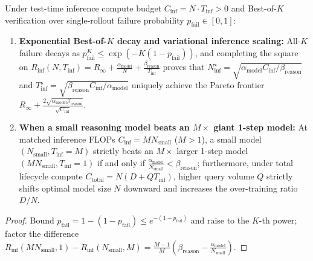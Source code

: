 \begin{lemma}\label{lem:test_time_scaling}
\leanok
{}
Under test-time inference compute budget $C_{\mathrm{inf}} = N \cdot T_{\mathrm{inf}} > 0$ and Best-of-$K$ verification over single-rollout failure probability $p_{\mathrm{fail}} \in [0,1]$:
\begin{enumerate}
\item \textbf{Exponential Best-of-$K$ decay and variational inference scaling:} All-$K$ failure decays as $p_{\mathrm{fail}}^K \le \exp(-K(1 - p_{\mathrm{fail}}))$, and completing the square on $R_{\mathrm{inf}}(N, T_{\mathrm{inf}}) = R_\infty + \frac{\alpha_{\mathrm{model}}}{N} + \frac{\beta_{\mathrm{reason}}}{T_{\mathrm{inf}}}$ proves that $N^\star_{\mathrm{inf}} = \sqrt{\alpha_{\mathrm{model}}C_{\mathrm{inf}}/\beta_{\mathrm{reason}}}$ and $T^\star_{\mathrm{inf}} = \sqrt{\beta_{\mathrm{reason}}C_{\mathrm{inf}}/\alpha_{\mathrm{model}}}$ uniquely achieve the Pareto frontier $R_\infty + \frac{2\sqrt{\alpha_{\mathrm{model}}\beta_{\mathrm{reason}}}}{\sqrt{C_{\mathrm{inf}}}}$.
\item \textbf{When a small reasoning model beats an $M\times$ giant 1-step model:} At matched inference FLOPs $C_{\mathrm{inf}} = M N_{\mathrm{small}}$ ($M > 1$), a small model $(N_{\mathrm{small}}, T_{\mathrm{inf}} = M)$ strictly beats an $M\times$ larger 1-step model $(M N_{\mathrm{small}}, T_{\mathrm{inf}} = 1)$ if and only if $\frac{\alpha_{\mathrm{model}}}{N_{\mathrm{small}}} < \beta_{\mathrm{reason}}$; furthermore, under total lifecycle compute $C_{\mathrm{total}} = N(D + Q T_{\mathrm{inf}})$, higher query volume $Q$ strictly shifts optimal model size $N$ downward and increases the over-training ratio $D/N$.
\end{enumerate}
\end{lemma}
\begin{proof}
\leanok
Bound $p_{\mathrm{fail}} = 1 - (1 - p_{\mathrm{fail}}) \le e^{-(1-p_{\mathrm{fail}})}$ and raise to the $K$-th power; factor the difference $R_{\mathrm{inf}}(M N_{\mathrm{small}}, 1) - R_{\mathrm{inf}}(N_{\mathrm{small}}, M) = \frac{M-1}{M}(\beta_{\mathrm{reason}} - \frac{\alpha_{\mathrm{model}}}{N_{\mathrm{small}}})$.
\end{proof}

